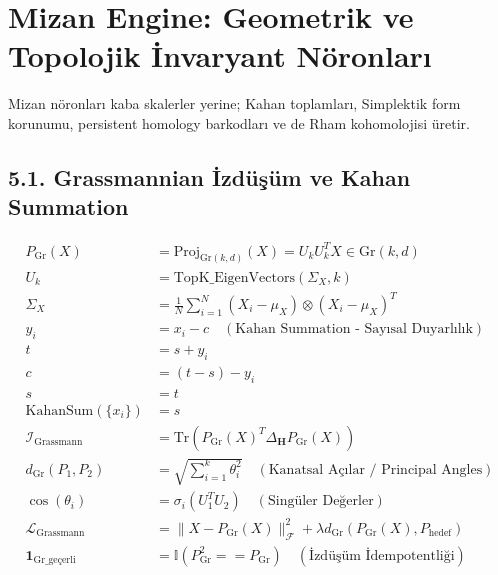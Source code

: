 \documentclass[11pt, a4paper]{article}
\begin{document}
\section{Mizan Engine: Geometrik ve Topolojik İnvaryant Nöronları}

Mizan nöronları kaba skalerler yerine; Kahan toplamları, Simplektik form korunumu, persistent homology barkodları ve de Rham kohomolojisi üretir.

\subsection{5.1. Grassmannian İzdüşüm ve Kahan Summation}
\begin{align}
P_{\text{Gr}}(X) &= \text{Proj}_{\text{Gr}(k, d)}(X) = U_k U_k^T X \in \text{Gr}(k, d) \\
U_k &= \text{TopK\_EigenVectors}(\Sigma_X, k) \\
\Sigma_X &= \frac{1}{N} \sum_{i=1}^N (X_i - \mu_X) \otimes (X_i - \mu_X)^T \\
y_i &= x_i - c \quad (\text{Kahan Summation - Sayısal Duyarlılık}) \\
t &= s + y_i \\
c &= (t - s) - y_i \\
s &= t \\
\text{KahanSum}(\{x_i\}) &= s \\
\mathcal{I}_{\text{Grassmann}} &= \text{Tr}(P_{\text{Gr}}(X)^T \Delta_{\mathbf{H}} P_{\text{Gr}}(X)) \\
d_{\text{Gr}}(P_1, P_2) &= \sqrt{\sum_{i=1}^k \theta_i^2} \quad (\text{Kanatsal Açılar / Principal Angles}) \\
\cos(\theta_i) &= \sigma_i(U_1^T U_2) \quad (\text{Singüler Değerler}) \\
\mathcal{L}_{\text{Grassmann}} &= \| X - P_{\text{Gr}}(X) \|_{\mathcal{F}}^2 + \lambda d_{\text{Gr}}(P_{\text{Gr}}(X), P_{\text{hedef}}) \\
\mathbf{1}_{\text{Gr\_geçerli}} &= \mathbb{I}\left( P_{\text{Gr}}^2 == P_{\text{Gr}} \right) \quad (\text{İzdüşüm İdempotentliği})
\end{align}
\end{document}
